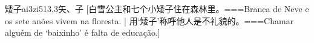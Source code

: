 \begin{EntryWithPhonetic}{矮子}{ai3zi5}{13,3}{⽮、⼦}
  [白雪公主和七个小矮子住在森林里。===Branca de Neve e os sete anões vivem na floresta. | 用`矮子'称呼他人是不礼貌的。===Chamar alguém de `baixinho' é falta de educação.]
\end{EntryWithPhonetic}

